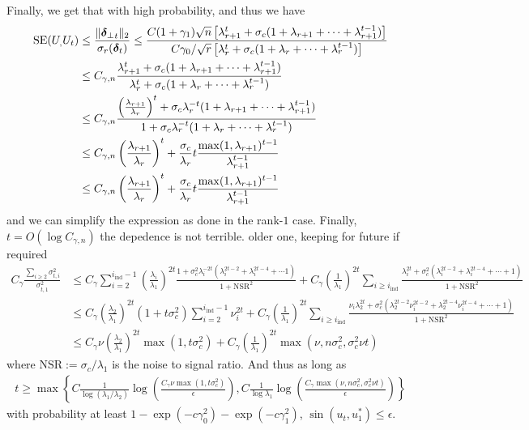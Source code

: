 \documentclass[10pt]{article}
\newcommand{\nsrmax}{\text{NSR}}
\newcommand{\ind}{\mathrm{ind}}
\newcommand{\SE}{\mathrm{SE}}
\begin{document}
Finally, we get that with high probability, 
and thus we have 
\begin{align*}
\SE(U_,U_t) &\leq \frac{\|\utsin_t\|_2}{\sigma_r(\utcos_t)} \leq \frac{C (1+ \gamma_1) \sqrt{n} \left[\lambda_{r+1}^t +  \sigma_c (1 + \lambda_{r+1} + \cdots +  \lambda_{r+1}^{t-1}) \right]}{C \gamma_0/\sqrt{r} \left[ \lambda_r^t + \sigma_c (1 + \lambda_r + \cdots + \lambda_r^{t-1})\right]} \\
&\leq C_{\gamma,n} \frac{\lambda_{r+1}^t +  \sigma_c (1 + \lambda_{r+1} + \cdots +  \lambda_{r+1}^{t-1})}{\lambda_r^t + \sigma_c (1 + \lambda_r + \cdots + \lambda_r^{t-1})}\\
&\leq C_{\gamma,n} \frac{\left(\frac{\lambda_{r+1}}{\lambda_r}\right)^t +  \sigma_c \lambda_r^{-t} (1 + \lambda_{r+1} + \cdots +  \lambda_{r+1}^{t-1})}{1 + \sigma_c \lambda_r^{-t} (1 + \lambda_r + \cdots + \lambda_r^{t-1})} \\
&\leq C_{\gamma,n} \left(\frac{\lambda_{r+1}}{\lambda_r}\right)^t + \frac{\sigma_c}{\lambda_r} t \frac{\max(1, \lambda_{r+1})^{t-1}}{\lambda_{r+1}^{t-1}}\\
&\leq C_{\gamma,n} \left(\frac{\lambda_{r+1}}{\lambda_r}\right)^t + \frac{\sigma_c}{\lambda_r} t \frac{\max(1, \lambda_{r+1})^{t-1}}{\lambda_{r+1}^{t-1}}\\
\end{align*}
and we can simplify the expression as done in the rank-$1$ case. Finally, $ t = O(\log C_{\gamma,n})$ the depedence is not terrible.
\clearpage
\null
\clearpage
{\color{red} older one, keeping for future if required
\begin{align*}
C_\gamma \frac{\sum_{i\geq 2} \sigma_{t,i}^2}{\sigma_{t,1}^2}  & \leq C_\gamma \sum_{i = 2}^{i_\ind -1} \left( \frac{\lambda_i}{\lambda_1} \right)^{2t} \frac{1 + \sigma_c^2 \lambda_i^{-2t} (\lambda_i^{2t-2} + \lambda_i^{2t-4} + \cdots 1)}{1 + \nsrmax^2} +  C_\gamma  \left( \frac{1}{\lambda_1} \right)^{2t} \sum_{i \geq i_\ind}  \frac{\lambda_i^{2t} + \sigma_c^2 (\lambda_i^{2t-2} + \lambda_i^{2t-4} + \cdots + 1)}{1 + \nsrmax^2}  \\
&\leq C_\gamma  \left( \frac{\lambda_2}{\lambda_1} \right)^{2t}  (1 + t\sigma_c^2) \sum_{i = 2}^{i_\ind -1}\nu_i^{2t}  +  C_\gamma  \left( \frac{1}{\lambda_1} \right)^{2t} \sum_{i \geq i_\ind}  \frac{\nu_i \lambda_2^{2t} + \sigma_c^2 (\lambda_2^{2t-2} \nu_i^{2t-2} + \lambda_2^{2t-4} \nu_i^{2t-4} + \cdots + 1)}{1 + \nsrmax^2} \\
&\leq C_\gamma \nu  \left( \frac{\lambda_2}{\lambda_1} \right)^{2t}  \max(1, t\sigma_c^2) +  C_\gamma  \left( \frac{1}{\lambda_1} \right)^{2t} \max(\nu, n \sigma_c^2, \sigma_c^2 \nu t) 
\end{align*}
where $\nsrmax := \sigma_c/\lambda_1$ is the noise to signal ratio. And thus as long as 
\begin{align*}
t \geq \max \left\{C \frac{1}{\log(\lambda_1/\lambda_2)} \log   \left( \frac{C_{\gamma} \nu  \max(1, t \sigma_c^2)}{\epsilon}\right),  C \frac{1}{\log \lambda_1} \log   \left( \frac{C_{\gamma}  \max(\nu, n \sigma_c^2, \sigma_c^2 \nu t)}{\epsilon}\right) \right\}
\end{align*}
with probability at least $1 - \exp(- c \gamma_0^2) - \exp(-c \gamma_1^2)$, $\sin(u_t, u_1^*) \leq \epsilon$.
}
\end{document}
